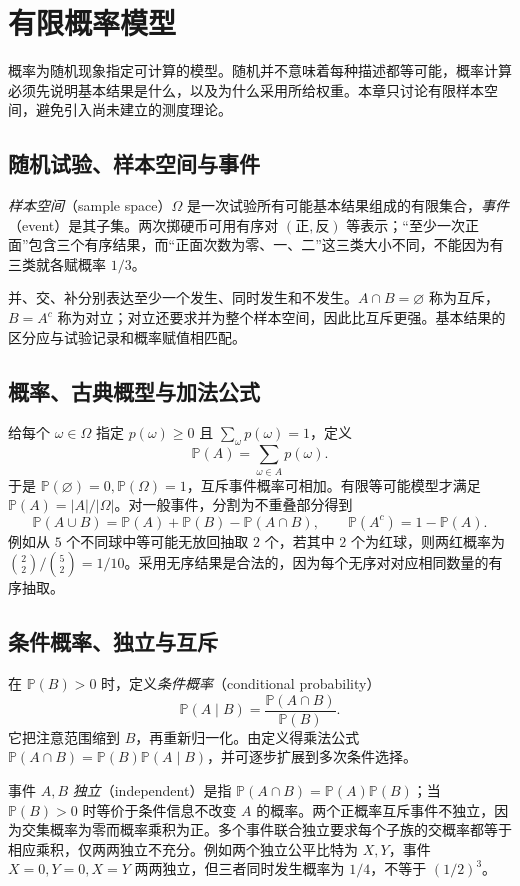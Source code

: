 \setcounter{chapter}{21} %
\chapter{有限概率模型}
\label{chap:em-probability}
概率为随机现象指定可计算的模型。随机并不意味着每种描述都等可能，概率计算必须先说明基本结果是什么，以及为什么采用所给权重。本章只讨论有限样本空间，避免引入尚未建立的测度理论。

\section{随机试验、样本空间与事件}
\emph{样本空间}（sample space）$\Omega$ 是一次试验所有可能基本结果组成的有限集合，\emph{事件}（event）是其子集。两次掷硬币可用有序对 $(\text{正},\text{反})$ 等表示；“至少一次正面”包含三个有序结果，而“正面次数为零、一、二”这三类大小不同，不能因为有三类就各赋概率 $1/3$。

并、交、补分别表达至少一个发生、同时发生和不发生。$A\cap B=\varnothing$ 称为互斥，$B=A^c$ 称为对立；对立还要求并为整个样本空间，因此比互斥更强。基本结果的区分应与试验记录和概率赋值相匹配。

\section{概率、古典概型与加法公式}
给每个 $\omega\in\Omega$ 指定 $p(\omega)\ge0$ 且 $\sum_\omega p(\omega)=1$，定义
\[
 \mathbb P(A)=\sum_{\omega\in A}p(\omega).
\]
于是 $\mathbb P(\varnothing)=0,\mathbb P(\Omega)=1$，互斥事件概率可相加。有限等可能模型才满足 $\mathbb P(A)=|A|/|\Omega|$。对一般事件，分割为不重叠部分得到
\[
 \mathbb P(A\cup B)=\mathbb P(A)+\mathbb P(B)-\mathbb P(A\cap B),
 \qquad \mathbb P(A^c)=1-\mathbb P(A).
\]
例如从 $5$ 个不同球中等可能无放回抽取 $2$ 个，若其中 $2$ 个为红球，则两红概率为 $\binom22/\binom52=1/10$。采用无序结果是合法的，因为每个无序对对应相同数量的有序抽取。

\section{条件概率、独立与互斥}
在 $\mathbb P(B)>0$ 时，定义\emph{条件概率}（conditional probability）
\[
 \mathbb P(A\mid B)=\frac{\mathbb P(A\cap B)}{\mathbb P(B)}.
\]
它把注意范围缩到 $B$，再重新归一化。由定义得乘法公式 $\mathbb P(A\cap B)=\mathbb P(B)\mathbb P(A\mid B)$，并可逐步扩展到多次条件选择。

事件 $A,B$ \emph{独立}（independent）是指 $\mathbb P(A\cap B)=\mathbb P(A)\mathbb P(B)$；当 $\mathbb P(B)>0$ 时等价于条件信息不改变 $A$ 的概率。两个正概率互斥事件不独立，因为交集概率为零而概率乘积为正。多个事件联合独立要求每个子族的交概率都等于相应乘积，仅两两独立不充分。例如两个独立公平比特为 $X,Y$，事件 $X=0,Y=0,X=Y$ 两两独立，但三者同时发生概率为 $1/4$，不等于 $(1/2)^3$。

